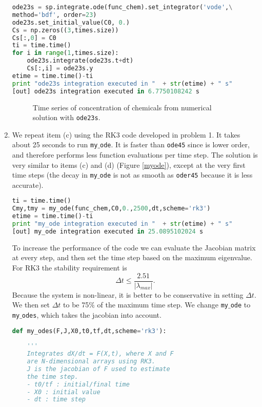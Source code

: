 \documentclass[11pt]{article}
\def\beq{\begin{equation}}
\def\eeq{\end{equation}}
\begin{document}
\begin{enumerate}[label=(\alph*)]
\begin{lstlisting}[language=Python]
ode23s = sp.integrate.ode(func_chem).set_integrator('vode',\
method='bdf', order=23)
ode23s.set_initial_value(C0, 0.)
Cs = np.zeros((3,times.size))
Cs[:,0] = C0
ti = time.time()
for i in range(1,times.size):
    ode23s.integrate(ode23s.t+dt)
    Cs[:,i] = ode23s.y
etime = time.time()-ti
print "ode23s integration executed in "  + str(etime) + " s"
[out] ode23s integration executed in 6.7750108242 s
\end{lstlisting}

\begin{figure}[p]
\centerline{}
\caption{Time series of concentration of chemicals from numerical solution with \texttt{ode23s}.}
    \label{ode23s}
\end{figure}

\item We repeat item (c) using the RK3 code developed in problem 1. It takes about 25 seconds to run \texttt{my$\_$ode}. It is faster than \texttt{ode45} since is lower order, and therefore performs less function evaluations per time step. The solution is very similar to items (c) and (d) (Figure \ref{myode}), except at the very first time steps (the decay in \texttt{my$\_$ode} is not as smooth as \texttt{oder45} because it is less accurate).  


\begin{lstlisting}[language=Python]
ti = time.time()
Cmy,tmy = my_ode(func_chem,C0,0.,2500,dt,scheme='rk3')
etime = time.time()-ti
print "my_ode integration executed in "  + str(etime) + " s"
[out] my_ode integration executed in 25.0895102024 s
\end{lstlisting}

  To increase the performance of the code we can evaluate the Jacobian matrix at every step, and then set the time step based on the maximum eigenvalue. For RK3 the stability requirement is
    \beq
        \Delta t \leq \frac{2.51}{|\lambda_{max}|}.
    \eeq
    Because the system is non-linear, it is better to be conservative in setting $\Delta t$. We then set $\Delta t$ to be 75$\%$ of the maximum time step. We change \texttt{my$\_$ode} to  \texttt{my$\_$odes}, which takes the jacobian into account. 


\begin{lstlisting}[language=Python]
def my_odes(F,J,X0,t0,tf,dt,scheme='rk3'):
    
    '''
    Integrates dX/dt = F(X,t), where X and F 
    are N-dimensional arrays using RK3. 
    J is the jacobian of F used to estimate
    the time step.
    - t0/tf : initial/final time
    - X0 : initial value
    - dt : time step
    

\end{lstlisting}
\end{enumerate}
\end{document}
